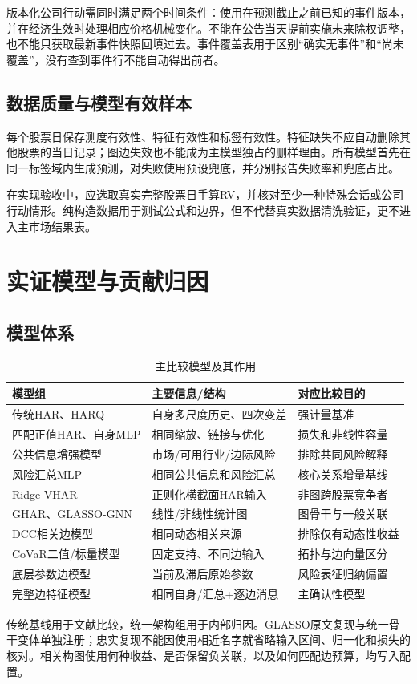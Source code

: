 版本化公司行动需同时满足两个时间条件：使用在预测截止之前已知的事件版本，并在经济生效时处理相应价格机械变化。不能在公告当天提前实施未来除权调整，也不能只获取最新事件快照回填过去。事件覆盖表用于区别“确实无事件”和“尚未覆盖”，没有查到事件行不能自动得出前者。

\subsection{数据质量与模型有效样本}
每个股票日保存测度有效性、特征有效性和标签有效性。特征缺失不应自动删除其他股票的当日记录；图边失效也不能成为主模型独占的删样理由。所有模型首先在同一标签域内生成预测，对失败使用预设兜底，并分别报告失败率和兜底占比。

在实现验收中，应选取真实完整股票日手算RV，并核对至少一种特殊会话或公司行动情形。纯构造数据用于测试公式和边界，但不代替真实数据清洗验证，更不进入主市场结果表。

\section{实证模型与贡献归因}
\subsection{模型体系}
\begin{table}[htbp]\centering\small
\caption{主比较模型及其作用}\label{tab:models}
\begin{tabularx}{\textwidth}{p{}YY}
\toprule 模型组 & 主要信息/结构 & 对应比较目的\\\midrule
传统HAR、HARQ & 自身多尺度历史、四次变差 & 强计量基准\\
匹配正值HAR、自身MLP & 相同缩放、链接与优化 & 损失和非线性容量\\
公共信息增强模型 & 市场/可用行业/边际风险 & 排除共同风险解释\\
风险汇总MLP & 相同公共信息和风险汇总 & 核心关系增量基线\\
Ridge-VHAR & 正则化横截面HAR输入 & 非图跨股票竞争者\\
GHAR、GLASSO-GNN & 线性/非线性统计图 & 图骨干与一般关联\\
DCC相关边模型 & 相同动态相关来源 & 排除仅有动态性收益\\
CoVaR二值/标量模型 & 固定支持、不同边输入 & 拓扑与边向量区分\\
底层参数边模型 & 当前及滞后原始参数 & 风险表征归纳偏置\\
完整边特征模型 & 相同自身/汇总+逐边消息 & 主确认性模型\\\bottomrule
\end{tabularx}
\end{table}
传统基线用于文献比较，统一架构组用于内部归因。GLASSO原文复现与统一骨干变体单独注册；忠实复现不能因使用相近名字就省略输入区间、归一化和损失的核对。相关构图使用何种收益、是否保留负关联，以及如何匹配边预算，均写入配置。

